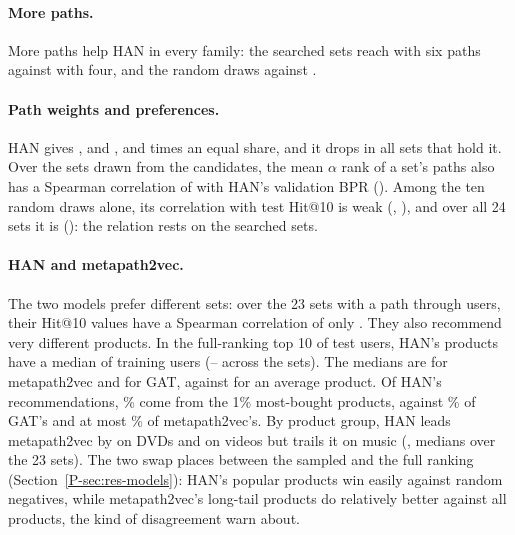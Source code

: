 \paragraph{More paths.} More paths help HAN in every family: the searched sets reach
 with six paths against  with four, and the
random draws  against .

\paragraph{Path weights and preferences.} HAN gives ,  and 
,  and  times an equal share, and it drops
 in all  sets that hold it. Over the  sets drawn from
the candidates, the mean $\alpha$ rank of a set's paths also has a Spearman correlation of
 with HAN's validation BPR (). Among the ten random
draws alone, its correlation with test Hit@10 is weak (,
), and over all 24 sets it is  (): the
relation rests on the searched sets.

\paragraph{HAN and metapath2vec.} The two models prefer different sets: over the 23 sets with a
path through users, their Hit@10 values have a Spearman correlation of only . They
also recommend very different products. In the full-ranking top 10 of  test users,
HAN's products have a median of  training users
(-- across the sets). The medians are  for
metapath2vec and  for GAT, against  for an average product. Of HAN's
recommendations, \% come from the 1\% most-bought products, against
\% of GAT's and at most \% of metapath2vec's. By product group, HAN leads
metapath2vec by  on DVDs and  on videos but trails it on
music (, medians over the 23 sets). The two swap places between the sampled
and the full ranking (Section~\ref*{P-sec:res-models}): HAN's popular products win easily against
 random negatives, while metapath2vec's long-tail products do relatively better
against all products, the kind of disagreement \citet{krichene2022sampled} warn about.

